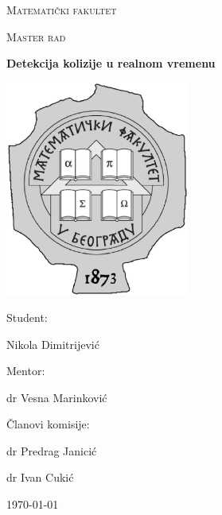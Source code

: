 \documentclass[a4paper]{article}
\begin{document}
\begin{titlepage} 
	\centering
	{\scshape\LARGE Matematički fakultet \par}
	\vspace{1cm}
	{\scshape Master rad\par}
	\vspace{0.5cm}
	{\huge\bfseries Detekcija kolizije u realnom vremenu\par}
	\vspace{0.5cm}
    \includegraphics[width=0.45\textwidth]{logo-matf.jpg}\par\vspace{1cm}
    Student:\par
	{ Nikola Dimitrijević\par}
	\vfill
	Mentor:\par
    dr Vesna Marinković
	\vfill
    
    Članovi komisije:\par
    dr Predrag Janicić\par
    dr Ivan Cukić


	\vfill

	{\large \today\par}
\end{titlepage}
\end{document}
